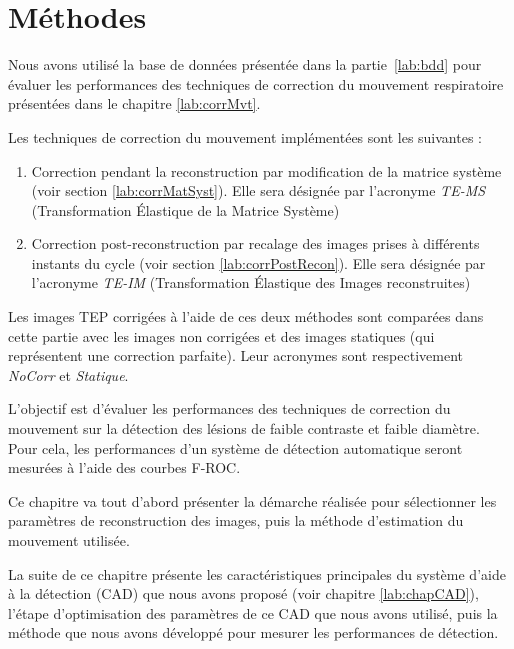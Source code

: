 \chapter{Méthodes}

Nous avons utilisé la base de données présentée dans la partie~\ref{lab:bdd} pour évaluer les performances des techniques de correction du mouvement respiratoire présentées dans le chapitre \ref{lab:corrMvt}. 

Les techniques de correction du mouvement implémentées sont les suivantes :

\begin{enumerate}
 \item Correction pendant la reconstruction par modification de la matrice système (voir section \ref{lab:corrMatSyst}). Elle sera désignée par l'acronyme \emph{TE-MS} (Transformation \'Elastique de la Matrice Système)
 \item Correction post-reconstruction par recalage des images prises à différents instants du cycle (voir section \ref{lab:corrPostRecon}). Elle sera désignée par l'acronyme \emph{TE-IM} (Transformation \'Elastique des Images reconstruites) 
\end{enumerate}

Les images TEP corrigées à l'aide de ces deux méthodes sont comparées dans cette partie avec les images non corrigées et des images statiques (qui représentent une correction parfaite). Leur acronymes sont respectivement \emph{NoCorr} et \emph{Statique}.

L'objectif est d'évaluer les performances des techniques de correction du mouvement sur la détection des lésions de faible contraste et faible diamètre. Pour cela, les performances d'un système de détection automatique seront mesurées à l'aide des courbes F-ROC.

Ce chapitre va tout d'abord présenter la démarche réalisée pour sélectionner les paramètres de reconstruction des images, puis la méthode d'estimation du mouvement utilisée. 

La suite de ce chapitre présente les caractéristiques principales du système d'aide à la détection (CAD) que nous avons proposé (voir chapitre \ref{lab:chapCAD}), l'étape d'optimisation des paramètres de ce CAD que nous avons utilisé, puis la méthode que nous avons développé pour mesurer les performances de détection.





